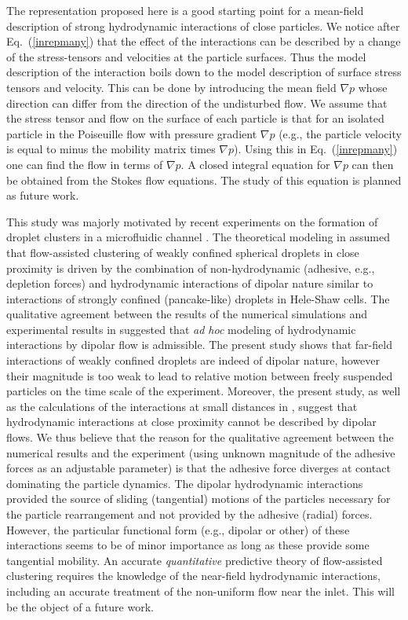 The representation proposed here is a good starting point for a mean-field description of strong hydrodynamic interactions of close particles. We notice after Eq.~(\ref{inrepmany}) that the effect of the interactions can be described by a  change of the stress-tensors and velocities at the particle surfaces. Thus the model description of the interaction boils down to the model description of surface stress tensors and velocity. This can be done by introducing the mean field $\nabla p$ whose direction can differ from the direction of the undisturbed flow. We assume that the stress tensor and flow on the surface of each particle is that for an isolated particle in the Poiseuille flow with pressure gradient $\nabla p$ (e.g., the particle velocity is equal to minus the mobility matrix times $\nabla p$). Using this in Eq.~(\ref{inrepmany}) one can find the flow in terms of $\nabla p$. A closed integral equation for $\nabla p$ can then be obtained from the Stokes flow equations. The study of this equation is planned as future work.

This study was majorly motivated by recent experiments on the formation of droplet clusters in a microfluidic channel \citep{tab0,tabeling}. The theoretical modeling in \cite{tabeling} assumed that flow-assisted clustering of weakly confined spherical droplets in close proximity is driven  by the combination of non-hydrodynamic (adhesive, e.g., depletion forces) and hydrodynamic interactions of dipolar nature similar to interactions of strongly confined (pancake-like) droplets in Hele-Shaw cells. The qualitative agreement between the results of the numerical simulations and experimental results in \cite{tabeling} suggested that \emph{ad hoc} modeling of hydrodynamic interactions by dipolar flow is admissible. The present study shows that far-field interactions of weakly confined droplets are indeed of dipolar nature, however their magnitude is too weak to lead to relative motion between freely suspended particles on the time scale of the experiment. Moreover, the present study, as well as the calculations of the interactions at small distances in \cite{tl2012,is}, suggest that hydrodynamic interactions  at close proximity cannot be described by dipolar flows. We thus believe that the reason for the qualitative agreement between the numerical results and the experiment (using unknown magnitude of the adhesive forces as an adjustable parameter) is that the adhesive force diverges at contact dominating the particle dynamics. The dipolar hydrodynamic interactions provided the source of sliding (tangential) motions of the particles necessary for the particle rearrangement and not provided by the adhesive (radial) forces. However, the particular functional form (e.g., dipolar or other) of these interactions seems to be of minor importance as long as these provide some tangential mobility. An accurate \emph{quantitative} predictive theory of flow-assisted clustering requires the knowledge of the near-field hydrodynamic interactions, including an accurate treatment of the non-uniform flow near the inlet. This will be the object of a future work.


